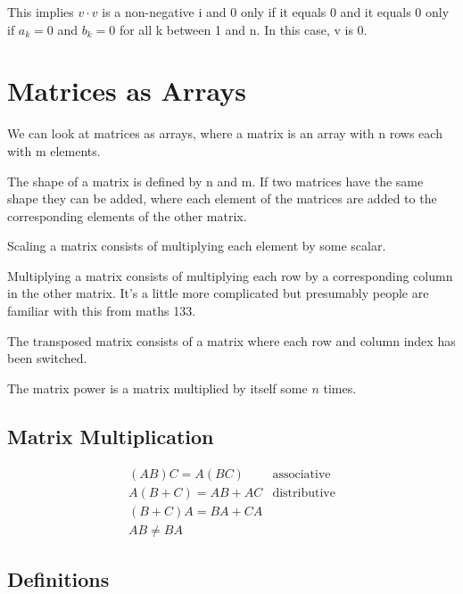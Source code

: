 		This implies $v \cdot v$ is a non-negative i and 0 only if it equals 0 and it equals 0 only if $a_k = 0$ and $b_k = 0$ for all k between 1 and n.
		In this case, v is 0.
		
\section{Matrices as Arrays}

	We can look at matrices as arrays, where a matrix is an array with n rows each with m elements.
	
	The shape of a matrix is defined by n and m.
	If two matrices have the same shape they can be added, where each element of the matrices are added to the corresponding elements of the other matrix.
	
	Scaling a matrix consists of multiplying each element by some scalar.
	
	Multiplying a matrix consists of multiplying each row by a corresponding column in the other matrix.
	It's a little more complicated but presumably people are familiar with this from maths 133.
	
	The transposed matrix consists of a matrix where each row and column index has been switched.
	
	The matrix power is a matrix multiplied by itself some $n$ times.
	
	\subsection{Matrix Multiplication}
	
		\begin{align}
			(AB)C = A(BC) & \textrm{associative} \\
			A(B+C) = AB + AC & \textrm{distributive} \\
			(B+C)A = BA + CA \\
			AB \neq BA
		\end{align}
		
	\subsection{Definitions}
	
